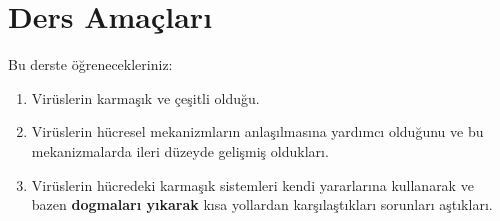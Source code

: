 \section{Ders Amaçları}\label{ders-amauxe7larux131}

Bu derste öğrenecekleriniz:

\begin{enumerate}
\def\labelenumi{\arabic{enumi}.}
\item
  Virüslerin karmaşık ve çeşitli olduğu.
\item
  Virüslerin hücresel mekanizmların anlaşılmasına yardımcı olduğunu ve
  bu mekanizmalarda ileri düzeyde gelişmiş oldukları.
\item
  Virüslerin hücredeki karmaşık sistemleri kendi yararlarına kullanarak
  ve bazen \textbf{dogmaları yıkarak} kısa yollardan karşılaştıkları
  sorunları aştıkları.
\end{enumerate}
